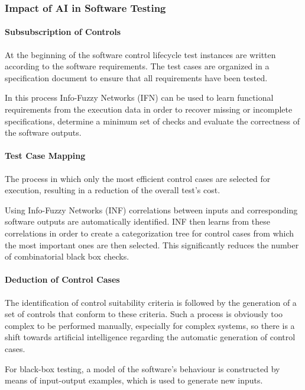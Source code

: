 \documentclass[12pt]{article}
\begin{document}
\subsubsection{Impact of AI in Software Testing} 

\paragraph{Subsubscription of Controls}
At the beginning of the software control lifecycle test instances are written according to the software requirements. The test cases are organized in a specification document to ensure that all requirements have been tested.
\par In this process Info-Fuzzy Networks (IFN) can be used to learn functional requirements from the execution data in order to recover missing or incomplete specifications, determine a minimum set of checks and evaluate the correctness of the software outputs.

\paragraph{Test Case Mapping}
The process in which only the most efficient control cases are selected for execution, resulting in a reduction of the overall test's cost.

\par Using Info-Fuzzy Networks (INF) correlations between inputs and corresponding software outputs are automatically identified. INF then learns from these correlations in order to create a categorization tree for control cases from which the most important ones are then selected. This significantly reduces the number of combinatorial black box checks.

\paragraph{Deduction of Control Cases}

The identification of control suitability criteria is followed by the generation of a set of controls that conform to these criteria. Such a process is obviously too complex to be performed manually, especially for complex systems, so there is a shift towards artificial intelligence regarding the automatic generation of control cases.


\par For black-box testing, a model of the software's behaviour is constructed by means of input-output examples, which is used to generate new inputs.
\end{document}
